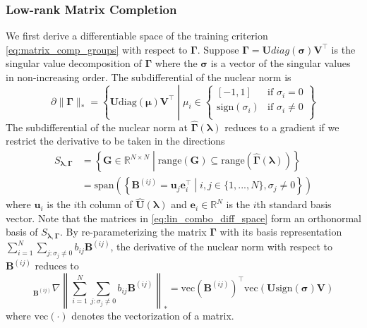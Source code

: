 \documentclass[12pt,letterpaper]{article}
\begin{document}
\subsubsection{Low-rank Matrix Completion}
We first derive a differentiable space of the training criterion \eqref{eq:matrix_comp_groups} with respect to $\boldsymbol{\Gamma}$. 
Suppose $\boldsymbol{\Gamma} = \boldsymbol{U}diag(\boldsymbol{\sigma}) \boldsymbol{V}^\top$ is the singular value decomposition of $\boldsymbol{\Gamma}$ where the $\boldsymbol{\sigma}$ is a vector of the singular values in non-increasing order. The subdifferential of the nuclear norm is \citep{parikh2014proximal}
\begin{equation}
\partial \| \boldsymbol{\Gamma} \|_* = 
\left \{
\boldsymbol{U} \text{diag}(\boldsymbol{\mu}) \boldsymbol{V}^\top \middle | 
\mu_i \in 
\begin{cases}
[-1, 1] & \text{if } \sigma_i = 0\\
\text{sign}(\sigma_i) & \text{if } \sigma_i \ne 0\\
\end{cases}
\right \}
\end{equation}
The subdifferential of the nuclear norm at $\hat{\boldsymbol{\Gamma}}(\boldsymbol{\lambda})$ reduces to a gradient if we restrict the derivative to be taken in the directions
\begin{align}
S_{\boldsymbol{\lambda}, \boldsymbol{\Gamma}} & =  \left \{
\boldsymbol{G} \in \mathbb{R}^{N\times N}
\middle |
\text{range}(\boldsymbol{G}) \subseteq \text{range}(\hat{\boldsymbol{\Gamma}}(\boldsymbol{\lambda}))
\right \} \\
& = 
\text{span}
\left (
\left \{
\boldsymbol{B}^{(ij)} = \boldsymbol{u}_j \boldsymbol{e}_i^\top
\middle | 
i,j  \in \{1,...,N\},
\sigma_j \ne 0
\right \}
\right )
\label{eq:lin_combo_diff_space}
\end{align}
where $\boldsymbol{u}_i$ is the $i$th column of $\hat{\boldsymbol{U}}(\boldsymbol{\lambda})$ and $\boldsymbol{e}_i \in \mathbb{R}^N$ is the $i$th standard basis vector. Note that the matrices in \eqref{eq:lin_combo_diff_space} form an orthonormal basis of $S_{\boldsymbol{\lambda}, \boldsymbol{\Gamma}}$. By re-parameterizing the matrix $\boldsymbol{\Gamma}$ with its basis representation $\sum_{i=1}^N \sum_{j : \sigma_j \ne 0} b_{ij} \boldsymbol{B}^{(ij)}$, the derivative of the nuclear norm with respect to $\boldsymbol{B}^{(ij)}$ reduces to
\begin{equation}
_{\boldsymbol{B}^{(ij)}}\nabla 
\left \| \sum_{i=1}^N \sum_{j : \sigma_j \ne 0} b_{ij} \boldsymbol{B}^{(ij)} 
\right \|_{*} = 
\text{vec} \left (\boldsymbol{B}^{(ij)} \right )^\top
\text{vec} \left ( \boldsymbol{U} \text{sign}(\boldsymbol{\sigma}) \boldsymbol{V} \right )
\label{eq:basis_repr_deriv}
\end{equation}
where $\text{vec}(\cdot)$ denotes the vectorization of a matrix.
\end{document}
